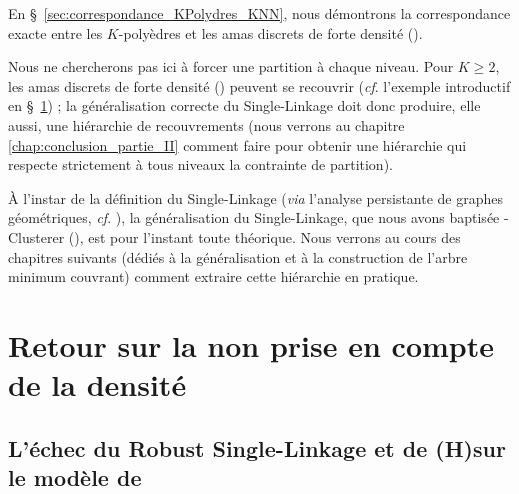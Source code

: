 En \S~\ref{sec:correspondance_KPolydres_KNN}, nous démontrons la correspondance exacte entre les $K$-polyèdres et les amas discrets de forte densité \KNN ().

Nous ne chercherons pas ici à forcer une partition à chaque niveau. Pour $K\ge 2$, les amas discrets de forte densité () peuvent se recouvrir (\emph{cf}. l'exemple introductif en \S~\ref{sec:exemple_introductif}) ; la généralisation correcte du Single-Linkage doit donc produire, elle aussi, une hiérarchie de recouvrements (nous verrons au chapitre \ref{chap:conclusion_partie_II} comment faire pour obtenir une hiérarchie qui respecte strictement à tous niveaux la contrainte de partition).

À l'instar de la définition du Single-Linkage (\emph{via} l'analyse persistante de graphes géométriques, \emph{cf}. ), la généralisation du Single-Linkage, que nous avons baptisée \HGP-Clusterer (), est pour l'instant toute théorique. Nous verrons au cours des chapitres suivants (dédiés à la généralisation et à la construction de l'arbre minimum couvrant) comment extraire cette hiérarchie en pratique.



\section{Retour sur la non prise en compte de la densité}
\label{sec:exemple_introductif}

\subsection{L'échec du Robust Single-Linkage et de (H)\DBSCAN sur le modèle de }

